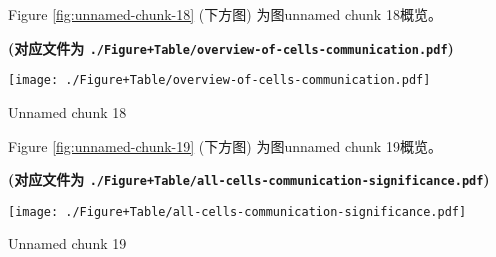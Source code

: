 \documentclass[
]{article}
\begin{document}
\begin{center}\vspace{1.5cm}\end{center}

Figure \ref{fig:unnamed-chunk-18} (下方图) 为图unnamed chunk 18概览。

\textbf{(对应文件为 \texttt{./Figure+Table/overview-of-cells-communication.pdf})}

\def\@captype{figure}
\begin{center}
\texttt{[image: ./Figure+Table/overview-of-cells-communication.pdf]}
\caption{Unnamed chunk 18}\label{fig:unnamed-chunk-18}
\end{center}

\begin{center}\vspace{1.5cm}\end{center}

\begin{center}\vspace{1.5cm}\end{center}

Figure \ref{fig:unnamed-chunk-19} (下方图) 为图unnamed chunk 19概览。

\textbf{(对应文件为 \texttt{./Figure+Table/all-cells-communication-significance.pdf})}

\def\@captype{figure}
\begin{center}
\texttt{[image: ./Figure+Table/all-cells-communication-significance.pdf]}
\caption{Unnamed chunk 19}\label{fig:unnamed-chunk-19}
\end{center}

\begin{center}\vspace{1.5cm}\end{center}
\end{document}
